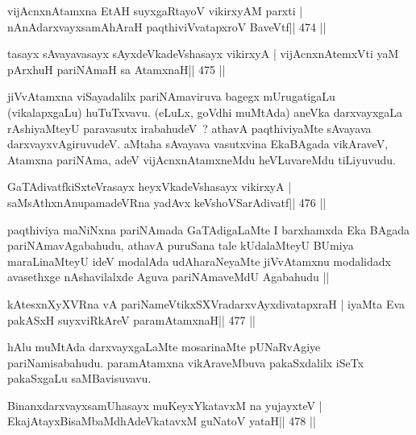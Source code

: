 

\begin{shl}
vijAcnxnAtamxna EtAH suyxgaRtayoV vikirxyAM parxti |
nAnAdarxvayxsamAhAraH paqthiviVvatapxroV BaveVtf\hfill || 474 ||
\end{shl}

\begin{shl}
tasayx sAvayavasayx sAyxdeVkadeVshasayx vikirxyA |
vijAcnxnAtemxVti yaM pArxhuH pariNAmaH sa AtamxnaH\hfill || 475 ||
\end{shl}

\begin{artha}
jiVvAtamxna viSayadalilx pariNAmaviruva bagegx mUrugatigaLu (vikalapxgaLu) huTuTxvavu. (eLuLx, goVdhi muMtAda) aneVka darxvayxgaLa rAshiyaMteyU paravasutx irabahudeV~? athavA paqthiviyaMte sAvayava darxvayxvAgiruvudeV. aMtaha sAvayava vasutxvina EkaBAgada vikAraveV, Atamxna pariNAma, adeV vijAcnxnAtamxneMdu heVLuvareMdu tiLiyuvudu.
\end{artha}



\begin{shl}
GaTAdivatfkiSxteVrasayx heyxVkadeVshasayx vikirxyA |
saMsAthxnAnupamadeVRna yadAvx keVshoVSarAdivatf\hfill || 476 ||
\end{shl}

\begin{artha}
paqthiviya maNiNxna pariNAmada GaTAdigaLaMte I barxhamxda Eka BAgada
pariNAmavAgabahudu, athavA puruSana tale kUdalaMteyU BUmiya
maraLinaMteyU ideV modalAda udAharaNeyaMte jiVvAtamxnu modalidadx
avasethxge nAshavilalxde Aguva pariNAmaveMdU Agabahudu ||  
\end{artha}

\begin{shl}
kAtesxnXyXVRna vA pariNameVtikxSXVradarxvAyxdivatapxraH |
iyaMta Eva pakASxH suyxviRkAreV paramAtamxnaH\hfill || 477 ||
\end{shl}

\begin{artha}
hAlu muMtAda darxvayxgaLaMte mosarinaMte pUNaRvAgiye pariNamisabahudu. paramAtamxna vikAraveMbuva pakaSxdalilx iSeTx pakaSxgaLu saMBavisuvavu.
\end{artha}


\begin{shl}
BinanxdarxvayxsamUhasayx muKeyxYkatavxM na yujayxteV |
EkajAtayxBisaMbaMdhAdeVkatavxM guNatoV yataH\hfill || 478 ||
\end{shl}

